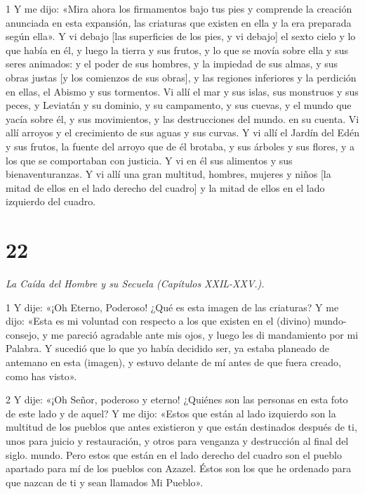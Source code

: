 \par 1 Y me dijo: «Mira ahora los firmamentos bajo tus pies y comprende la creación anunciada en esta expansión, las criaturas que existen en ella y la era preparada según ella». Y vi debajo [las superficies de los pies, y vi debajo] el sexto cielo y lo que había en él, y luego la tierra y sus frutos, y lo que se movía sobre ella y sus seres animados: y el poder de sus hombres, y la impiedad de sus almas, y sus obras justas [y los comienzos de sus obras], y las regiones inferiores y la perdición en ellas, el Abismo y sus tormentos. Vi allí el mar y sus islas, sus monstruos y sus peces, y Leviatán y su dominio, y su campamento, y sus cuevas, y el mundo que yacía sobre él, y sus movimientos, y las destrucciones del mundo. en su cuenta. Vi allí arroyos y el crecimiento de sus aguas y sus curvas. Y vi allí el Jardín del Edén y sus frutos, la fuente del arroyo que de él brotaba, y sus árboles y sus flores, y a los que se comportaban con justicia. Y vi en él sus alimentos y sus bienaventuranzas. Y vi allí una gran multitud, hombres, mujeres y niños [la mitad de ellos en el lado derecho del cuadro] y la mitad de ellos en el lado izquierdo del cuadro.

\chapter{22}

\par \textit{La Caída del Hombre y su Secuela (Capítulos XXIL-XXV.).}

\par 1 Y dije: «¡Oh Eterno, Poderoso! ¿Qué es esta imagen de las criaturas? Y me dijo: «Esta es mi voluntad con respecto a los que existen en el (divino) mundo-consejo, y me pareció agradable ante mis ojos, y luego les di mandamiento por mi Palabra. Y sucedió que lo que yo había decidido ser, ya estaba planeado de antemano en esta (imagen), y estuvo delante de mí antes de que fuera creado, como has visto».

\par 2 Y dije: «¡Oh Señor, poderoso y eterno! ¿Quiénes son las personas en esta foto de este lado y de aquel? Y me dijo: «Estos que están al lado izquierdo son la multitud de los pueblos que antes existieron y que están destinados después de ti, unos para juicio y restauración, y otros para venganza y destrucción al final del siglo. mundo. Pero estos que están en el lado derecho del cuadro son el pueblo apartado para mí de los pueblos con Azazel. Éstos son los que he ordenado para que nazcan de ti y sean llamados Mi Pueblo».

